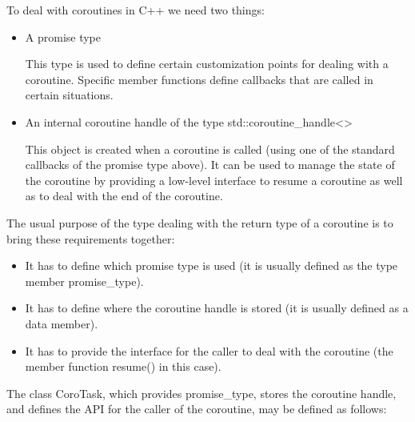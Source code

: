 To deal with coroutines in C++ we need two things:

\begin{itemize}
\item 
A promise type 

This type is used to define certain customization points for dealing with a coroutine. Specific member functions define callbacks that are called in certain situations.

\item 
An internal coroutine handle of the type std::coroutine\_handle<>

This object is created when a coroutine is called (using one of the standard callbacks of the promise type above). It can be used to manage the state of the coroutine by providing a low-level interface to resume a coroutine as well as to deal with the end of the coroutine.
\end{itemize}

The usual purpose of the type dealing with the return type of a coroutine is to bring these requirements together:

\begin{itemize}
\item 
It has to define which promise type is used (it is usually defined as the type member promise\_type).

\item 
It has to define where the coroutine handle is stored (it is usually defined as a data member).

\item 
It has to provide the interface for the caller to deal with the coroutine (the member function resume() in this case).
\end{itemize}


The class CoroTask, which provides promise\_type, stores the coroutine handle, and defines the API for the caller of the coroutine, may be defined as follows:


